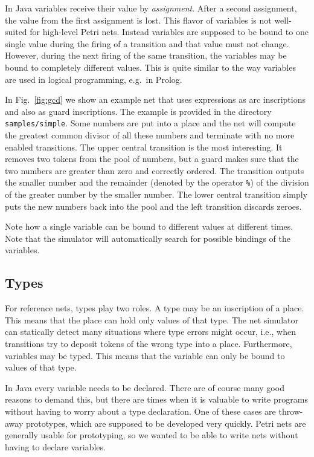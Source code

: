 In Java
variables receive their value by \emph{assignment}. After a second
assignment, the value from the first assignment is lost.
This flavor of variables is not well-suited for high-level
Petri nets. Instead variables are supposed to be bound to one
single value during the firing of a transition and that value
must not change.
However, during the next firing of the same
transition, the variables may be bound to completely different values.
This is quite similar to the way variables are used in logical
programming, e.g.~in Prolog.


In Fig.~\ref{fig:gcd} we show an example net that uses
expressions as arc inscriptions and also as guard inscriptions.
The example is provided in the directory \texttt{samples/simple}.
Some numbers are put into a place and the net will compute
the greatest common divisor of all these numbers and terminate
with no more enabled transitions. The upper central transition is the
most interesting. It removes two tokens from the pool of numbers,
but a guard makes sure that the two numbers are greater than
zero and correctly ordered. The transition outputs the smaller number
and the remainder (denoted by the operator \texttt{\%})
of the division of the greater number by the smaller number.
The lower central transition simply puts the new numbers
back into the pool and the left transition discards zeroes.

Note how a single variable can be bound to different values
at different times. Note that the simulator will automatically search
for possible bindings of the variables.


\subsection{Types}
\label{subsec:types}

For reference nets, types play two roles. A type may be
an inscription of a place. This means that the place can hold only
values of that type. The net simulator can statically detect
many situations where type errors might occur, i.e., when transitions
try to deposit tokens of the wrong type into a place.
Furthermore, variables may be typed. This means that the variable
can only be bound to values of that type.

In Java every variable needs to be declared. There are of course
many good reasons to demand this, but there are times when
it is valuable to write programs without having to worry
about a type declaration. One of these cases are throw-away
prototypes, which are supposed to be developed very quickly.
Petri nets are generally usable for prototyping, so we wanted
to be able to write nets without having to declare variables.

